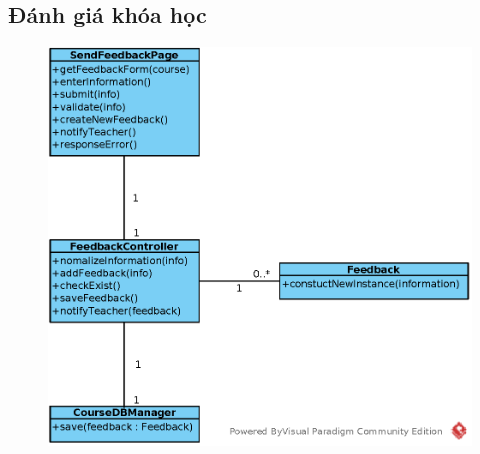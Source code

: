 \documentclass[./../main_file.tex]{subfiles}
\begin{document}
\subsection{Đánh giá khóa học}
\begin{figure}[H]
	\centering
	\includegraphics[width=\linewidth]{./images/define_operations/ucd_method_feedbackcourse.eps}
\end{figure}
\end{document}
